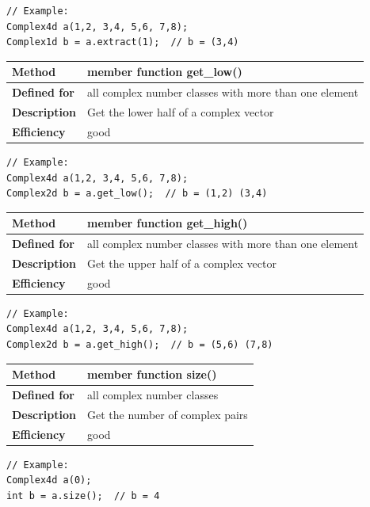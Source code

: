 \documentclass[11pt,a4paper,oneside,openright]{report}
\newcommand{\vspacesmall}{\vspace{3mm}}
\newcommand{\vspacebig}{\vspace{6mm}}
\begin{document}
\begin{lstlisting}[frame=none]
// Example:
Complex4d a(1,2, 3,4, 5,6, 7,8);
Complex1d b = a.extract(1);  // b = (3,4)
\end{lstlisting}
\vspacebig

\begin{tabular}{|p{25mm}|p{100mm}|}
\hline
\bfseries Method & member function get\_low() \\ \hline
\bfseries Defined for & all complex number classes with more than one element
 \\ \hline
\bfseries Description & Get the lower half of a complex vector \\ \hline
\bfseries Efficiency & good \\ \hline
\end{tabular}
\vspacesmall

\begin{lstlisting}[frame=none]
// Example:
Complex4d a(1,2, 3,4, 5,6, 7,8);
Complex2d b = a.get_low();  // b = (1,2) (3,4)
\end{lstlisting}
\vspacebig


\begin{tabular}{|p{25mm}|p{100mm}|}
\hline
\bfseries Method & member function get\_high() \\ \hline
\bfseries Defined for & all complex number classes with more than one element
 \\ \hline
\bfseries Description & Get the upper half of a complex vector \\ \hline
\bfseries Efficiency & good \\ \hline
\end{tabular}
\vspacesmall

\begin{lstlisting}[frame=none]
// Example:
Complex4d a(1,2, 3,4, 5,6, 7,8);
Complex2d b = a.get_high();  // b = (5,6) (7,8)
\end{lstlisting}
\vspacebig


\begin{tabular}{|p{25mm}|p{100mm}|}
\hline
\bfseries Method & member function size() \\ \hline
\bfseries Defined for & all complex number classes
 \\ \hline
\bfseries Description & Get the number of complex pairs \\ \hline
\bfseries Efficiency & good \\ \hline
\end{tabular}
\vspacesmall

\begin{lstlisting}[frame=none]
// Example:
Complex4d a(0);
int b = a.size();  // b = 4
\end{lstlisting}
\vspacebig
\end{document}
